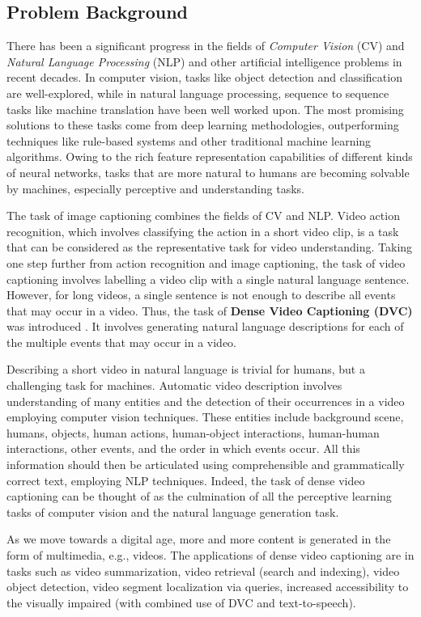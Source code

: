 \subsection{Problem Background}

\par There has been a significant progress in the fields of \textit{Computer Vision} (CV) and \textit{Natural Language Processing} (NLP) and other artificial intelligence problems in recent decades. In computer vision, tasks like object detection and classification are well-explored, while in natural language processing, sequence to sequence tasks like machine translation have been well worked upon. The most promising solutions to these tasks come from deep learning methodologies, outperforming techniques like rule-based systems and other traditional machine learning algorithms. Owing to the rich feature representation capabilities of different kinds of neural networks, tasks that are more natural to humans are becoming solvable by machines, especially perceptive and understanding tasks.

\par The task of image captioning combines the fields of CV and NLP. Video action recognition, which involves classifying the action in a short video clip, is a task that can be considered as the representative task for video understanding. Taking one step further from action recognition and image captioning, the task of video captioning involves labelling a video clip with a single natural language sentence. However, for long videos, a single sentence is not enough to describe all events that may occur in a video. Thus, the task of \textbf{Dense Video Captioning (DVC)} was introduced \cite{krishna2017densecaptioning}. It involves generating natural language descriptions for each of the multiple events that may occur in a video.

\par Describing a short video in natural language is trivial for humans, but a challenging task for machines. Automatic video description involves understanding of many entities and the detection of their occurrences in a video employing computer vision techniques. These entities include background scene, humans, objects, human actions, human-object interactions, human-human interactions, other events, and the order in which events occur. All this information should then be articulated using comprehensible and grammatically correct text, employing NLP	techniques\cite{aafaq2020video}. Indeed, the task of dense video captioning can be thought of as the culmination of all the perceptive learning tasks of computer vision and the natural language generation task.

\par As we move towards a digital age, more and more content is generated in the form of multimedia, e.g., videos. The applications of dense video captioning are in tasks such as video summarization, video retrieval (search and indexing), video object detection, video segment localization via queries, increased accessibility to the visually impaired (with combined use of DVC and text-to-speech).